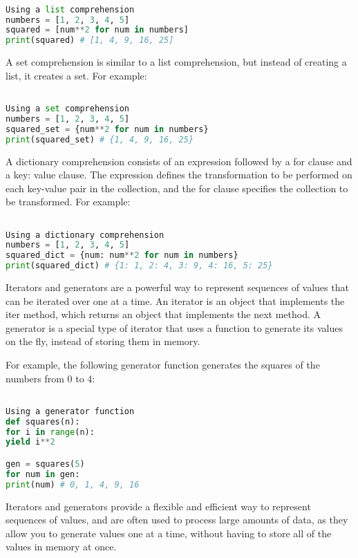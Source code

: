 \documentclass[12pt, a4paper, oneside]{article}
\begin{document}
\begin{lstlisting}[language=Python, frame=single]

Using a list comprehension
numbers = [1, 2, 3, 4, 5]
squared = [num**2 for num in numbers]
print(squared) # [1, 4, 9, 16, 25]
\end{lstlisting}

A set comprehension is similar to a list comprehension, but instead of creating a list, it creates a set. For example:

\begin{lstlisting}[language=Python, frame=single]

Using a set comprehension
numbers = [1, 2, 3, 4, 5]
squared_set = {num**2 for num in numbers}
print(squared_set) # {1, 4, 9, 16, 25}
\end{lstlisting}

A dictionary comprehension consists of an expression followed by a for clause and a key: value clause. The expression defines the transformation to be performed on each key-value pair in the collection, and the for clause specifies the collection to be transformed. For example:

\begin{lstlisting}[language=Python, frame=single]

Using a dictionary comprehension
numbers = [1, 2, 3, 4, 5]
squared_dict = {num: num**2 for num in numbers}
print(squared_dict) # {1: 1, 2: 4, 3: 9, 4: 16, 5: 25}
\end{lstlisting}

Iterators and generators are a powerful way to represent sequences of values that can be iterated over one at a time. An iterator is an object that implements the iter method, which returns an object that implements the next method. A generator is a special type of iterator that uses a function to generate its values on the fly, instead of storing them in memory.

For example, the following generator function generates the squares of the numbers from 0 to 4:

\begin{lstlisting}[language=Python, frame=single]

Using a generator function
def squares(n):
for i in range(n):
yield i**2

gen = squares(5)
for num in gen:
print(num) # 0, 1, 4, 9, 16
\end{lstlisting}

Iterators and generators provide a flexible and efficient way to represent sequences of values, and are often used to process large amounts of data, as they allow you to generate values one at a time, without having to store all of the values in memory at once.
\end{document}
